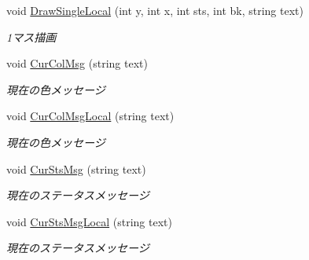 \begin{DoxyCompactItemize}
void \hyperlink{class_reversi4color_form_1_1_reversi_a82fb011304d47866a85a9092fe4be6b7}{Draw\+Single\+Local} (int y, int x, int sts, int bk, string text)
\begin{DoxyCompactList}\small\item\em 1マス描画 \end{DoxyCompactList}\item 
void \hyperlink{class_reversi4color_form_1_1_reversi_acb7220a84f599ebf736216cc055b2ae3}{Cur\+Col\+Msg} (string text)
\begin{DoxyCompactList}\small\item\em 現在の色メッセージ \end{DoxyCompactList}\item 
void \hyperlink{class_reversi4color_form_1_1_reversi_a6ab2074a5474736e76644cf45c08827b}{Cur\+Col\+Msg\+Local} (string text)
\begin{DoxyCompactList}\small\item\em 現在の色メッセージ \end{DoxyCompactList}\item 
void \hyperlink{class_reversi4color_form_1_1_reversi_af82882188f72f849b21890fe21199083}{Cur\+Sts\+Msg} (string text)
\begin{DoxyCompactList}\small\item\em 現在のステータスメッセージ \end{DoxyCompactList}\item 
void \hyperlink{class_reversi4color_form_1_1_reversi_a663e1d055e099d0855df8a34af31edf9}{Cur\+Sts\+Msg\+Local} (string text)
\begin{DoxyCompactList}\small\item\em 現在のステータスメッセージ \end{DoxyCompactList}\end{DoxyCompactItemize}
